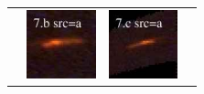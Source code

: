 \documentclass[useAMS,usenatbib]{mn2e}
\begin{document}
\begin{table}
\begin{tabular}{cccc}
    & \multicolumn{1}{m{1.7cm}}{\includegraphics[height=2.00cm,clip]{figs/enfw_img/rgb.pre_7_b_a_tri.ps}}
    & \multicolumn{1}{m{1.7cm}}{\includegraphics[height=2.00cm,clip]{figs/enfw_img/rgb.pre_7_c_a_tri.ps}} \\
  \end{tabular}

\end{table}
\end{document}
